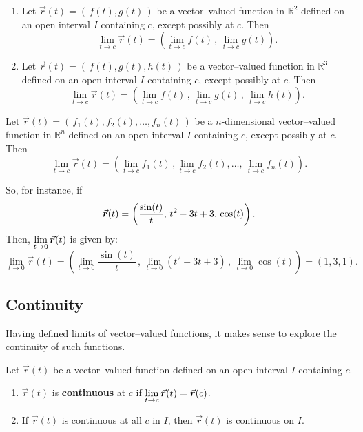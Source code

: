 \ifcalculus
\begin{theorem}\label{thm:vvf_limit}
\begin{enumerate}
	\item Let $\vec r(t) = \left( \,f(t),g(t)\,\right)$ be a vector--valued function in $\mathbb{R}^2$ defined on an open interval $I$ containing $c$, except possibly at $c$. Then
	$$\lim_{t\to c} \vec r(t) = \left( \lim_{t\to c}f(t)\, , \,\lim_{t\to c} g(t)\right).$$
	\item Let $\vec r(t) = \left( \,f(t),g(t),h(t)\,\right)$ be a vector--valued function in $\mathbb{R}^3$ defined on an open interval $I$ containing $c$, except possibly at $c$. Then 
	$$\lim_{t\to c} \vec r(t) = \left( \lim_{t\to c}f(t)\, , \,\lim_{t\to c} g(t)\,, \,\lim_{t\to c} h(t)\right).$$
\end{enumerate}
\end{theorem}
\fi


\ifanalysis
\begin{theorem}\label{thm:vvf_limit}
Let $\vec r(t) = \left( \,f_1(t),f_2(t),\ldots,f_n(t)\,\right)$ be a $n$-dimensional vector--valued function in $\mathbb{R}^n$ defined on an open interval $I$ containing $c$, except possibly at $c$. Then
	$$\lim_{t\to c} \vec r(t) = \left( \lim_{t\to c}f_1(t)\,,\lim_{t\to c}f_2(t) ,\ldots, \,\lim_{t\to c} f_n(t)\right).$$
\end{theorem}
\fi

So, for instance, if 
\begin{equation}
\ds\vec r(t) = \left( \frac{\sin(t)}{t},\, t^2-3t+3,\,\cos(t)\right).
\label{vb_funvector}
\end{equation}
Then, $\ds \lim_{t\to 0}\vec r(t)$ is given by:
$$
\lim_{t\to0} \vec r(t) = \left( \lim_{t\to 0}\frac{\sin(t)}{t}\, , \, \lim_{t\to 0} (t^2-3t+3)\, , \, \lim_{t\to 0} \cos(t)\right)=\left( 1,3,1\right).
$$

\subsection{Continuity}
Having defined limits of vector--valued functions, it makes sense to explore the continuity of such functions. 


\begin{definition}\label{def:vvf_continuity}
Let $\vec r(t)$ be a vector--valued function defined on an open interval $I$ containing $c$.
\begin{enumerate}
	\item $\vec r(t)$ is \textbf{continuous} at $c$ if $\ds \lim_{t\to c} \vec r(t) = \vec r(c)$.
	\item	If $\vec r(t)$ is continuous at all $c$ in $I$, then $\vec r(t)$ is continuous on $I$.
\end{enumerate}
\end{definition}

